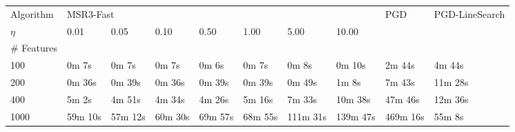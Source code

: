 \begin{tabular}{l||lllllll|l|l}
\toprule
Algorithm & \multicolumn{7}{l}{MSR3-Fast} &       PGD & PGD-LineSearch \\
$\eta$ &     0.01  &    0.05  &    0.10  &    0.50  &    1.00  &     5.00  &     10.00 &    &         \\
\hline \hline 
\# Features &           &          &          &          &          &           &           &           &                \\
100                &     0m 7s &    0m 7s &    0m 7s &    0m 6s &    0m 7s &     0m 8s &    0m 10s &    2m 44s &         4m 44s \\
200                &    0m 36s &   0m 39s &   0m 36s &   0m 39s &   0m 39s &    0m 49s &     1m 8s &    7m 43s &        11m 28s \\
400                &     5m 2s &   4m 51s &   4m 34s &   4m 26s &   5m 16s &    7m 33s &   10m 38s &   47m 46s &        12m 36s \\
1000               &   59m 10s &  57m 12s &  60m 30s &  69m 57s &  68m 55s &  111m 31s &  139m 47s &  469m 16s &         55m 8s \\
\bottomrule
\end{tabular}
